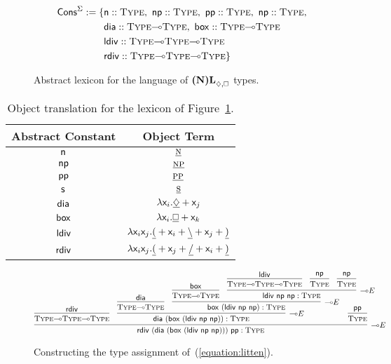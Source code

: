 \begin{figure}
	\begin{align*}
	\cons^{\Sigma} := \{ 
		& 	\smallterm{n} :: \type[s],\ \smallterm{np} :: \type[s],\ \smallterm{pp} :: \type[s],\ \smallterm{np} :: \type[s],\\
		&	\smallterm{dia} :: \type[s]\li\type[s],\ \smallterm{box} :: \type[s]\li\type[s]\\
		&	\smallterm{ldiv} :: \type[s]\li\type[s]\li\type[s] \\
		&	\smallterm{rdiv} :: \type[s]\li\type[s]\li\type[s] \}
	\end{align*}
	\caption{Abstract lexicon for the language of $\logic{(N)L}_{\diamond, \bx}$ types.}
	\label{figure:acg_nl_abstract_lex}
\end{figure}

\begin{table}
	\centering
	\begin{tabularx}{0.75\textwidth}{@{}cc@{}}
		Abstract Constant							& Object Term\\
		\toprule
		$\mathsf{n}$								& $\underline{\normalfont\textsc{n}}$\\
		$\mathsf{np}$							& $\underline{\normalfont\textsc{np}}$\\
		$\mathsf{pp}$							& $\underline{\normalfont\textsc{pp}}$\\
		$\mathsf{s}$								& $\underline{\normalfont\textsc{s}}$\\
		$\mathsf{dia}$							& $\smallterm{\lam  \vari.\underline{\diamond} + \varj}$\\		
		$\mathsf{box}$							& $\smallterm{\lam  \vari.\underline{\bx} + \vark}$\\		
		$\mathsf{ldiv}$							& $\mathsf{\mathnormal{\lambda}  \mathsf{x}_{\mathnormal{i}}\mathsf{x}_{\mathnormal{j}}.\underline{(} + \mathsf{x}_{\mathnormal{i}} + \underline{\backslash} + \mathsf{x}_{\mathnormal{j}} + \underline{)}}$\\
		$\mathsf{rdiv}$							& $\mathsf{\mathnormal{\lambda}  \mathsf{x}_{\mathnormal{i}}\mathsf{x}_{\mathnormal{j}}.\underline{(} + \mathsf{x}_{\mathnormal{j}} + \underline{/} + \mathsf{x}_{\mathnormal{i}} + \underline{)}}$
	\end{tabularx}
	\caption{Object translation for the lexicon of Figure~\ref{figure:acg_nl_abstract_lex}.}
	\label{table:nl_tg_acg}
\end{table}

\begin{figure}
	{\smaller
	\[
		\infer[\li E]{\term{rdiv~(dia~(box~(ldiv~np~np)))~pp}:\type}{
			\infer{\type\li\type\li\type}{\term{rdiv}}
			&
			\infer[\li E]{\term{dia~(box~(ldiv~np~np))}: \type}{
				\infer{\type\li\type}{\term{dia}}
				&
				\infer[\li E]{\term{box~(ldiv~np~np)}: \type}{
					\infer{\type\li \type}{\term{box}}
					&
					\infer[\li E]{\term{ldiv~np~np}: \type}{
						\infer{\type \li \type \li \type}{\term{ldiv}}
						&
						\infer{\type}{\term{np}}
						&
						\infer{\type}{\term{np}}
					}					
				}
			}
			&
			\hspace{-45pt}
			\infer{\type}{\term{pp}}
		}
	\]
	}
	\caption{Constructing the type assignment of~(\ref{equation:litten}).}
	\label{figure:litten_acg_der}
\end{figure}

